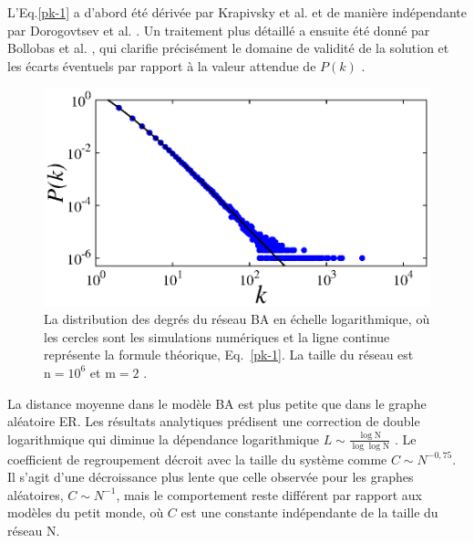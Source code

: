 L'Eq.\ref{pk-1} a d'abord été dérivée par Krapivsky et al. \cite{Krapivsky-al2000} et de manière indépendante par Dorogovtsev et al. \cite{Dorogovtsev-al2000-2}. Un traitement plus détaillé a ensuite été donné par Bollobas et al. \cite{Bollobas-Riordan2002}, qui clarifie précisément le domaine de validité de la solution et les écarts éventuels par rapport à la valeur attendue de  $P(k)$ .

\begin{figure}[h!]
	\centering
	\includegraphics[scale=1]{./figures/fig-barabasi}
	\caption{La distribution des degrés du réseau BA en échelle logarithmique, où les cercles sont les simulations numériques et la ligne continue représente la formule théorique, Eq.~\ref{pk-1}. La taille du réseau est $\mathrm{n}=10^{6}$ et $\mathrm{m}=2$ .}	
	\label{BA-distribution}
\end{figure} 

La distance moyenne dans le modèle BA est plus petite que dans le graphe aléatoire ER. Les résultats analytiques prédisent une correction de double logarithmique qui diminue la dépendance logarithmique $ L\sim\frac{\log \mathrm{N}}{\log\log\mathrm{N} }$ \cite{Bollobas-Riordan2002}. Le coefficient de regroupement décroit avec la taille du système comme $C\sim N^{-0,75}$. Il s'agit d'une décroissance plus lente que celle observée pour les graphes aléatoires, $C\sim N^{-1}$, mais le comportement reste différent par rapport aux modèles du petit monde, où $C$ est une constante indépendante de la taille du réseau $\mathrm{N}$.